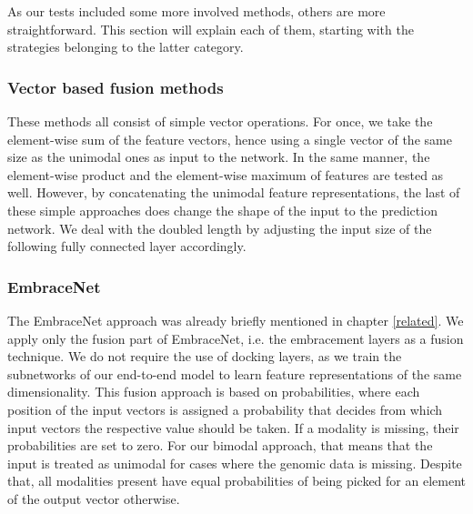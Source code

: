 As our tests included some more involved methods, others are more straightforward. This section will explain each of them, starting with the strategies belonging to the latter category.

\subsubsection{Vector based fusion methods} 
These methods all consist of simple vector operations. For once, we take the element-wise sum of the feature vectors, hence using a single vector of the same size as the unimodal ones as input to the network. In the same manner, the element-wise product and the element-wise maximum of features are tested as well. However, by concatenating the unimodal feature representations, the last of these simple approaches does change the shape of the input to the prediction network. We deal with the doubled length by adjusting the input size of the following fully connected layer accordingly.

\subsubsection{EmbraceNet} The EmbraceNet \cite{Choi2019EmbraceNet} approach was already briefly mentioned in chapter \ref{related}. We apply only the fusion part of EmbraceNet, i.e. the embracement layers as a fusion technique. We do not require the use of docking layers, as we train the subnetworks of our end-to-end model to learn feature representations of the same dimensionality. This fusion approach is based on probabilities, where each position of the input vectors is assigned a probability that decides from which input vectors the respective value should be taken. If a modality is missing, their probabilities are set to zero. For our bimodal approach, that means that the input is treated as unimodal for cases where the genomic data is missing. Despite that, all modalities present have equal probabilities of being picked for an element of the output vector otherwise.

